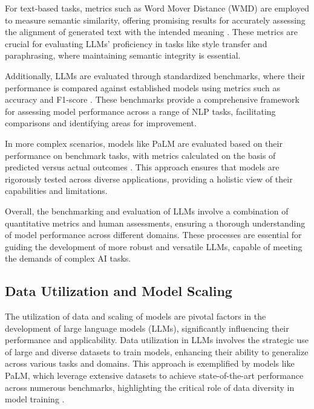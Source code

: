 For text-based tasks, metrics such as Word Mover Distance (WMD) are employed to measure semantic similarity, offering promising results for accurately assessing the alignment of generated text with the intended meaning \cite{yamshchikov2020styletransferparaphraselookingsensible}. These metrics are crucial for evaluating LLMs' proficiency in tasks like style transfer and paraphrasing, where maintaining semantic integrity is essential.

Additionally, LLMs are evaluated through standardized benchmarks, where their performance is compared against established models using metrics such as accuracy and F1-score \cite{touvron2023llama}. These benchmarks provide a comprehensive framework for assessing model performance across a range of NLP tasks, facilitating comparisons and identifying areas for improvement.

In more complex scenarios, models like PaLM are evaluated based on their performance on benchmark tasks, with metrics calculated on the basis of predicted versus actual outcomes \cite{chowdhery2023palm}. This approach ensures that models are rigorously tested across diverse applications, providing a holistic view of their capabilities and limitations.

Overall, the benchmarking and evaluation of LLMs involve a combination of quantitative metrics and human assessments, ensuring a thorough understanding of model performance across different domains. These processes are essential for guiding the development of more robust and versatile LLMs, capable of meeting the demands of complex AI tasks.




\subsection{Data Utilization and Model Scaling} \label{subsec:Data Utilization and Model Scaling}



The utilization of data and scaling of models are pivotal factors in the development of large language models (LLMs), significantly influencing their performance and applicability. Data utilization in LLMs involves the strategic use of large and diverse datasets to train models, enhancing their ability to generalize across various tasks and domains. This approach is exemplified by models like PaLM, which leverage extensive datasets to achieve state-of-the-art performance across numerous benchmarks, highlighting the critical role of data diversity in model training \cite{chowdhery2023palm}.



